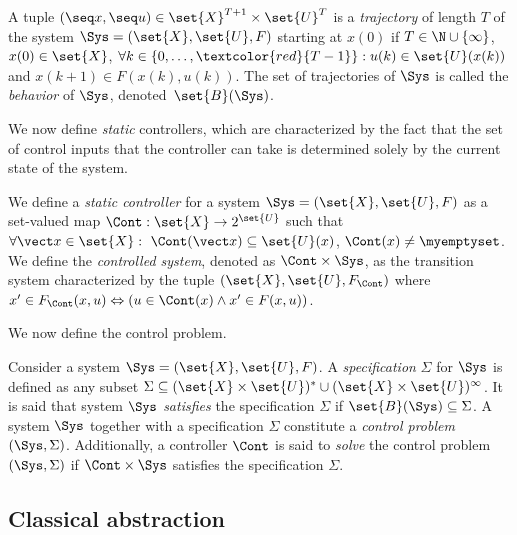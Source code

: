 \documentclass{juliacon}
\begin{document}
\vskip 6pt
A tuple $(\seq x, \seq u)\in \set{X}^{T+1}\times \set{U}^{T}$ is a \emph{trajectory} of length $T$ of the system $\Sys=(\set{X},\set{U}, F)$ starting at $x(0)$ if $T\in\N\cup \{\infty\}$, $x(0)\in\set{X}$, $\forall k\in \{0,\ldots,\textcolor{red}{T-1}\}: u(k)\in \set{U}(x(k))$ and $x(k+1) \in F(x(k), u(k))$.
The set of trajectories of $\Sys$ is called the \emph{behavior} of $\Sys$, denoted~$\set{B}(\Sys)$.

\vskip 6pt 

We now define \emph{static} controllers, which are characterized by the fact that the set of control inputs that the controller can take is determined solely by the current state of the system.

\begin{defi}\label{def:controller}
 We define a \emph{static controller} for a system $\Sys = (\set{X},\set{U}, F)$ as a set-valued map $\Cont :\set{X}\rightarrow 2^\set{U}$ such that $\forall \vect x\in\set{X}: \ \Cont(\vect x) \subseteq \set{U}(x)$, $\Cont(x) \ne \myemptyset$. We define the \emph{controlled system}, denoted as $\Cont\times \Sys$, as the transition system characterized by the tuple $(\set{X},\set{U}, F_{\Cont})$ where
 $x'\in F_{\Cont}(x, u) \Leftrightarrow (u\in \Cont(x)\land x'\in F(x,u))$.
\end{defi}

%
We now define the control problem.
\begin{defi}\label{def:specification}
Consider a system $\Sys = (\set{X},\set{U}, F)$. A \emph{specification} $\Sigma$ for $\Sys$ is defined as any subset \color{red}$\Sigma \subseteq (\set{X}\times \set{U})^{*} \cup (\set{X}\times \set{U})^{\infty}$\color{black}. It is said that system $\Sys$ \emph{satisfies} the specification $\Sigma$ if $\set{B}(\Sys)\subseteq \Sigma$. 
A system $\Sys$ together with a specification $\Sigma$ constitute a \emph{control problem} $(\Sys,\Sigma)$.
Additionally, a controller $\Cont$ is said to \emph{solve} the control problem $(\Sys,\Sigma)$ if $\Cont\times \Sys$ satisfies the specification $\Sigma$.
\end{defi}

\subsection{Classical abstraction}
\end{document}
